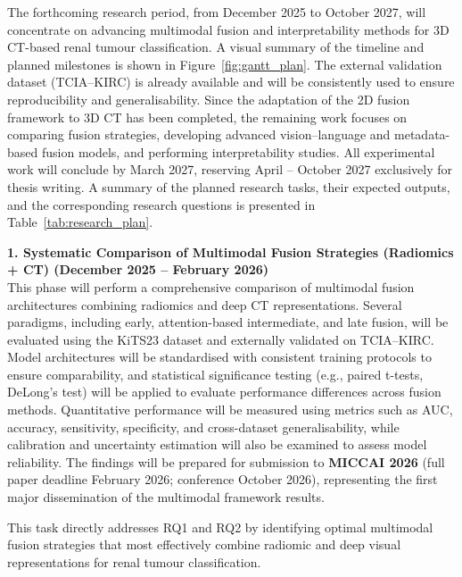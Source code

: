 \documentclass[final,british,a4paper,12pt]{phdthesis}
\begin{document}
The forthcoming research period, from December 2025 to October 2027, will concentrate on advancing multimodal fusion and interpretability methods for 3D CT-based renal tumour classification. A visual summary of the timeline and planned milestones is shown in Figure~\ref{fig:gantt_plan}.
The external validation dataset (TCIA–KIRC) is already available and will be consistently used to ensure
reproducibility and generalisability. Since the adaptation of the 2D fusion framework to 3D CT has been completed, the remaining work focuses on comparing fusion strategies, developing advanced vision–language and metadata-based fusion models, and performing interpretability studies. All experimental work will conclude by March 2027, reserving April – October 2027 exclusively for thesis writing. A summary of the planned research tasks, their expected outputs, and the corresponding research questions is presented in Table~\ref{tab:research_plan}.



\textbf{1. Systematic Comparison of Multimodal Fusion Strategies (Radiomics + CT) (December 2025 – February 2026)}\\
This phase will perform a comprehensive comparison of multimodal fusion architectures combining radiomics and deep CT representations. 
Several paradigms, including early, attention-based intermediate, and late fusion, will be evaluated using the KiTS23 dataset and externally validated on TCIA–KIRC. 
Model architectures will be standardised with consistent training protocols to ensure comparability, and statistical significance testing (e.g., paired t-tests, DeLong’s test) will be applied to evaluate performance differences across fusion methods. 
Quantitative performance will be measured using metrics such as AUC, accuracy, sensitivity, specificity, and cross-dataset generalisability, while calibration and uncertainty estimation will also be examined to assess model reliability. 
The findings will be prepared for submission to \textbf{MICCAI 2026} (full paper deadline February 2026; conference October 2026), representing the first major dissemination of the multimodal framework results. 

This task directly addresses RQ1 and RQ2 by identifying optimal multimodal fusion strategies that most effectively combine radiomic and deep visual representations for renal tumour classification.\\[1em]
\end{document}
